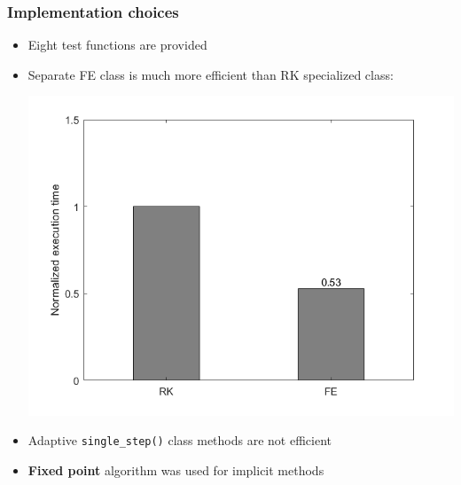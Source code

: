 \documentclass{beamer}
\begin{document}
\begin{frame} %
	\frametitle{Implementation choices}
	\begin{itemize}
		\item Eight test functions are provided
		\item Separate FE class is much more efficient than RK specialized class:
		\begin{center}
			\includegraphics[scale=0.3]{etc/FE_vs_RK.jpeg}
		\end{center}
		\pause	
		\item Adaptive \texttt{single\_step()} class methods are not efficient
		\item \textbf{Fixed point} algorithm was used for implicit methods
	\end{itemize}
\end{frame}
\end{document}
